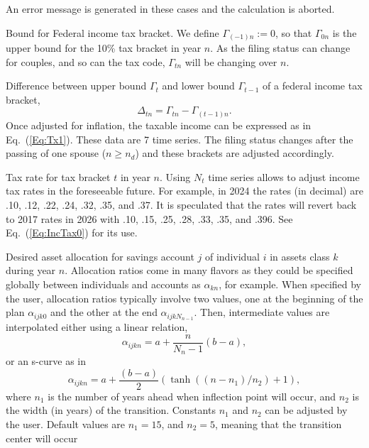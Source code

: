 \documentclass{report}[fleqn,12pt]
\begin{document}
\begin{description}[leftmargin=4em,style=multiline]
	An error message is generated in these cases and the calculation is aborted.
\item [$\Gamma_{tn}$]
	Bound for Federal income tax bracket. We define $\Gamma_{(-1)n} := 0$, so that
	$\Gamma_{0n}$ is the upper bound for the 10\% tax bracket in year $n$. As the filing status
	can change for couples, and so can the tax code, $\Gamma_{tn}$ will be changing over $n$.
\item [$\Delta_{tn}$]
	Difference between upper bound $\Gamma_t$ and lower bound $\Gamma_{t-1}$
	of a federal income tax bracket,
	\begin{equation}
		\Delta_{tn} = \Gamma_{tn} - \Gamma_{(t-1)n}.
	\end{equation}
	Once adjusted for inflation,
	the taxable income can be expressed as in Eq.~(\ref{Eq:Tx1}). These data are 7 time series.
	The filing status changes after the passing of one spouse ($n \ge n_d$) and these
	brackets are adjusted accordingly.
\item [$\theta_{tn}$]
	Tax rate for tax bracket $t$ in year $n$. Using $N_t$ time series allows to adjust income
	tax rates in the foreseeable future.
	For example, in 2024 the rates (in decimal) are .10, .12, .22, .24, .32, .35, and .37.
	It is speculated that the rates will revert back to 2017 rates in 2026 with
	.10, .15, .25, .28, .33, .35, and .396. See Eq.~(\ref{Eq:IncTax0}) for its use.
\item [$\alpha_{ijkn}$]
	Desired asset allocation for savings account $j$ of individual $i$ in
	assets class $k$ during year $n$.
	Allocation ratios come in many flavors as they could be specified globally between
	individuals and accounts as $\alpha_{kn}$, for example.
	When specified by the user, allocation ratios typically involve two values, one at the
	beginning of the plan $\alpha_{ijk0}$ and the other at the end
	$\alpha_{ijkN_{n-1}}$. Then, intermediate values are interpolated either using
	a linear relation,
\begin{equation}
	\alpha_{ijkn} = a + \frac{n}{N_n - 1} (b - a),
\end{equation}
or an s-curve as in
\begin{equation}
	\alpha_{ijkn} = a + \frac{(b - a)}{2}
	(\tanh((n-n_1)/n_2) + 1),
\end{equation}
	where $n_1$ is the number of years ahead when inflection point will occur, and $n_2$ is the
	width (in years) of the transition. Constants $n_1$ and $n_2$ can be adjusted by the user.
	Default values are $n_1 = 15$, and $n_2 = 5$, meaning that the transition center will occur

\end{description}
\end{document}

